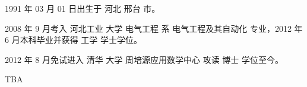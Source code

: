 \begin{resume}


  1991 年 03 月 01 日出生于 河北 邢台 市。

  2008 年 9 月考入 河北工业 大学  电气工程 系 电气工程及其自动化 专业，2012 年 6 月本科毕业并获得 工学 学士学位。

  2012 年 8 月免试进入 清华 大学 周培源应用数学中心 攻读 博士 学位至今。


  \begin{publications}
  TBA
  \end{publications}

\end{resume}

